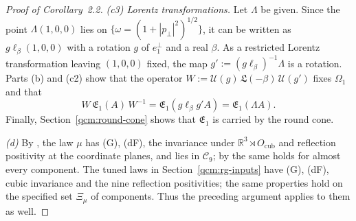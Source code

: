 \documentclass[11pt,letterpaper,reqno]{amsart}
\theoremstyle{definition}
\begin{document}
\begin{proof}[Proof of Corollary~2.2]
\emph{(c3) Lorentz transformations.}
Let $\Lambda$ be given.
Since the point $\Lambda(1,0,0)$ lies on $\{\omega=(1+|p_\perp|^2)^{1/2}\}$, it can be written as $g\ell_\beta(1,0,0)$ with a rotation $g$ of $e_1^\perp$ and a real $\beta$.
As a restricted Lorentz transformation leaving $(1,0,0)$ fixed, the map $g':=(g\ell_\beta)^{-1}\Lambda$ is a rotation.
Parts (b) and (c2) show that the operator $W:=\mathcal U(g)\,\mathfrak L(-\beta)\,\mathcal U(g')$ fixes $\Omega_1$ and that
\begin{equation*}
W\,\mathfrak E_1(A)\,W^{-1}=\mathfrak E_1(g\ell_\beta g'A)=\mathfrak E_1(\Lambda A).
\end{equation*}
Finally, Section~\ref{qcm:round-cone} shows that $\mathfrak E_1$ is carried by the round cone.

\emph{(d)} By \cite[Section~6, Section~7.5, and Theorem~8.6]{QEDConstruction}, the law $\mu$ has (G), (dF), the invariance under $\mathbb R^3\rtimes O_{\mathrm{cub}}$ and reflection positivity at the coordinate planes, and lies in $\mathcal C_9$; by \cite[Section~6, Section~7.5, and Theorem~8.6]{QEDConstruction} the same holds for almost every component.
The tuned laws in Section~\ref{qcm:rg-inputs} have (G), (dF), cubic invariance and the nine reflection positivities; the same properties hold on the specified set $\Xi_\mu$ of components. Thus the preceding argument applies to them as well.
\end{proof}
\end{document}
